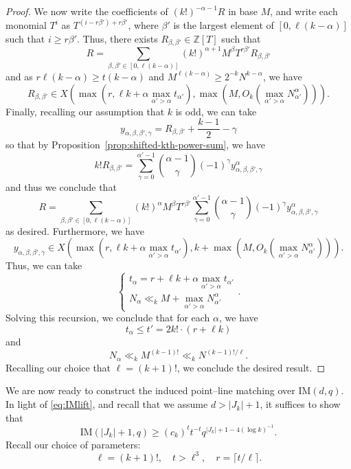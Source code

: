\documentclass[12pt,reqno]{amsart}
\theoremstyle{plain}
\theoremstyle{definition}
\newcommand{\Z}{\mathbb{Z}}
\newcommand{\IM}{\mathrm{IM}}
\newcommand{\1}{\mathbf{1}}
\begin{document}
\begin{proof}
    We now write the coefficients of  $(k!)^{-\alpha - 1} R$ in base $M$, and write each monomial $T^{i}$ as $T^{(i - r \beta') + r \beta'}$, where $\beta'$ is the largest element of $ [0, \ell (k - \alpha)]$ such that $i \geq r \beta'$. Thus, there exists $R_{\beta, \beta'} \in \Z[T]$ such that
    $$R = \sum_{\beta, \beta' \in [0, \ell (k - \alpha)]}(k!)^{\alpha + 1} M^{\beta} T^{r \beta'} R_{\beta, \beta'}$$
    and as $r \ell (k - \alpha) \geq t (k - \alpha)$ and $M^{\ell (k - \alpha)} \geq 2^{-k} N^{k - \alpha}$, we have
    $$R_{\beta, \beta'} \in X\left(\max(r, \ell k + \alpha \max_{\alpha' > \alpha} t_{\alpha'}), \max(M, O_k(\max_{\alpha' > \alpha} N_{\alpha'}^{\alpha}))\right).$$
    Finally, recalling our assumption that $k$ is odd, we can take
    $$y_{\alpha, \beta, \beta', \gamma} = R_{\beta, \beta'} + \frac{k - 1}{2} - \gamma$$
    so that by Proposition~\ref{prop:shifted-kth-power-sum}, we have
    $$k! R_{\beta, \beta'} = \sum_{\gamma = 0}^{\alpha' - 1} \binom{\alpha - 1}{\gamma} (-1)^{\gamma}  y_{\alpha, \beta, \beta', \gamma}^{\alpha}$$
    and thus we conclude that
    $$R = \sum_{\beta, \beta' \in [0, \ell (k - \alpha)]}(k!)^\alpha M^{\beta} T^{r \beta'} \sum_{\gamma = 0}^{\alpha' - 1} \binom{\alpha - 1}{\gamma} (-1)^{\gamma}  y_{\alpha, \beta, \beta', \gamma}^{\alpha}$$
    as desired. Furthermore, we have
    $$y_{\alpha, \beta, \beta', \gamma} \in X\left(\max(r, \ell k + \alpha \max_{\alpha' > \alpha} t_{\alpha'}), k + \max(M, O_k(\max_{\alpha' > \alpha} N_{\alpha'}^{\alpha}))\right).$$
    Thus, we can take
    $$\begin{cases}
        t_{\alpha} = r + \ell k + \alpha \max_{\alpha' > \alpha} t_{\alpha'} \\ 
        N_{\alpha} \ll_k M + \max_{\alpha' > \alpha} N_{\alpha'}^{\alpha}
    \end{cases}.$$
    Solving this recursion, we conclude that for each $\alpha$, we have
    $$t_{\alpha} \leq t' = 2k! \cdot (r + \ell k)$$
    and
    $$N_{\alpha} \ll_k M^{(k - 1)!} \ll_k N^{(k - 1)! / \ell}.$$
    Recalling our choice that $\ell = (k + 1)!$, we conclude the desired result.
\end{proof}
We are now ready to construct the induced point--line matching over $\IM(d, q)$. In light of \eqref{eq:IMlift}, and recall that we assume $d > |J_k| + 1$, it suffices to show that
$$\IM(|J_k| + 1, q) \geq (c_k)^t t^{-t} q^{|J_k| + 1 - 4 (\log k)^{-1}}.$$
Recall our choice of parameters:
$$\ell = (k + 1)!, \quad t > \ell^3, \quad r = \lceil t / \ell \rceil.$$
\end{document}
